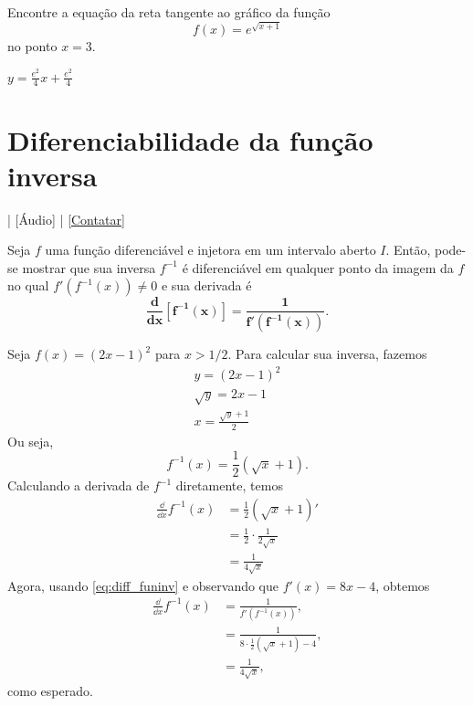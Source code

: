 \begin{exer}
  Encontre a equação da reta tangente ao gráfico da função
  \begin{equation}
    f(x) = e^{\sqrt{x+1}}
  \end{equation}
  no ponto $x=3$.
\end{exer}
\begin{resp}
  $y = \frac{e^2}{4}x + \frac{e^2}{4}$
\end{resp}

\section{Diferenciabilidade da função inversa}\label{cap_deriv_sec_funinv}

\begin{flushright}
  [Vídeo] | [Áudio] | \href{https://phkonzen.github.io/notas/contato.html}{[Contatar]}
\end{flushright}

Seja $f$ uma função diferenciável e injetora em um intervalo aberto $I$. Então, pode-se mostrar que sua inversa $f^{-1}$ é diferenciável em qualquer ponto da imagem da $f$ no qual $f'(f^{-1}(x))\neq 0$ e sua derivada é
\begin{equation}\label{eq:diff_funinv}
  \pmb{\frac{d}{dx}[f^{-1}(x)] = \frac{1}{f'(f^{-1}(x))}}.
\end{equation}

\begin{ex}
  Seja $f(x) = (2x-1)^2$ para $x>1/2$. Para calcular sua inversa, fazemos
  \begin{gather}
    y = (2x-1)^2 \\
    \sqrt{y} = 2x-1 \\
    x = \frac{\sqrt{y}+1}{2}
  \end{gather}
  Ou seja,
  \begin{equation}
    f^{-1}(x) = \frac{1}{2}(\sqrt{x}+1).
  \end{equation}
  Calculando a derivada de $f^{-1}$ diretamente, temos
  \begin{align}
    \frac{\dd}{\dd x}f^{-1}(x) &= \frac{1}{2}\left(\sqrt{x}+1\right)' \\
                               &= \frac{1}{2}\cdot\frac{1}{2\sqrt{x}} \\
                               &= \frac{1}{4\sqrt{x}}
  \end{align}
  Agora, usando \eqref{eq:diff_funinv} e observando que $f'(x) = 8x-4$, obtemos
  \begin{align}
    \frac{\dd}{\dd x}f^{-1}(x) &= \frac{1}{f'(f^{-1}(x))},\\
                               &= \frac{1}{8\cdot \frac{1}{2}\left(\sqrt{x}+1\right)-4}, \\
                               &= \frac{1}{4\sqrt{x}},
  \end{align}
  como esperado.
\end{ex}

